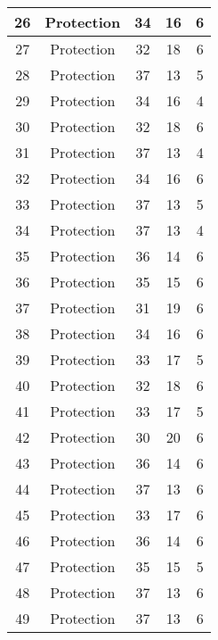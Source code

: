 \documentclass[results.tex]{subfiles}
\begin{document}
\begin{center}
\begin{tabular}{| c || c | c | c | c |}
    \hline
    26 & Protection & 34 & 16 & 6 \\ 
    \hline
    27 & Protection & 32 & 18 & 6 \\ 
    \hline
    28 & Protection & 37 & 13 & 5 \\ 
    \hline
    29 & Protection & 34 & 16 & 4 \\ 
    \hline
    30 & Protection & 32 & 18 & 6 \\ 
    \hline
    31 & Protection & 37 & 13 & 4 \\ 
    \hline
    32 & Protection & 34 & 16 & 6 \\ 
    \hline
    33 & Protection & 37 & 13 & 5 \\ 
    \hline
    34 & Protection & 37 & 13 & 4 \\ 
    \hline
    35 & Protection & 36 & 14 & 6 \\ 
    \hline
    36 & Protection & 35 & 15 & 6 \\ 
    \hline
    37 & Protection & 31 & 19 & 6 \\ 
    \hline
    38 & Protection & 34 & 16 & 6 \\ 
    \hline
    39 & Protection & 33 & 17 & 5 \\ 
    \hline
    40 & Protection & 32 & 18 & 6 \\ 
    \hline
    41 & Protection & 33 & 17 & 5 \\ 
    \hline
    42 & Protection & 30 & 20 & 6 \\ 
    \hline
    43 & Protection & 36 & 14 & 6 \\ 
    \hline
    44 & Protection & 37 & 13 & 6 \\ 
    \hline
    45 & Protection & 33 & 17 & 6 \\ 
    \hline
    46 & Protection & 36 & 14 & 6 \\ 
    \hline
    47 & Protection & 35 & 15 & 5 \\ 
    \hline
    48 & Protection & 37 & 13 & 6 \\ 
    \hline
    49 & Protection & 37 & 13 & 6 \\ 
    \hline   \end{tabular}
\end{center}
\end{document}
